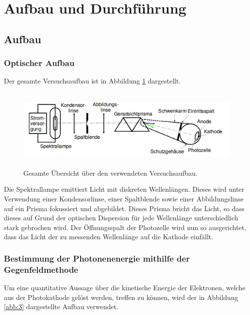 \section{Aufbau und Durchführung}
\subsection{Aufbau}
\label{sec:Aufbau}

\subsubsection{Optischer Aufbau}

Der gesamte Versuchsaufbau ist in Abbildung \ref{abb:2} dargestellt.
\begin{figure}
  \centering
  \includegraphics[height=4cm]{ressources/aufbau_2.png}
  \caption{Gesamte Übersicht über den verwendeten Versuchsaufbau. \cite{skript}}
  \label{abb:2}
\end{figure}

Die Spektrallampe emittiert Licht mit diskreten Wellenlängen. Dieses wird unter Verwendung einer Kondensorlinse, einer Spaltblende sowie einer Abbildungslinse auf ein Prisma fokussiert und abgebildet.
Dieses Prisma bricht das Licht, so dass dieses auf Grund der optischen Dispersion für jede Wellenlänge unterschiedlich stark gebrochen wird.
Der Öffnungsspalt der Photozelle wird nun so ausgerichtet, dass das Licht der zu messenden Wellenlänge auf die Kathode einfällt.

\subsubsection{Bestimmung der Photonenenergie mithilfe der Gegenfeldmethode}

Um eine quantitative Aussage über die kinetische Energie der Elektronen, welche aus der Photokathode gelöst werden, treffen zu können, wird der in Abbildung \ref{abb:3} dargestellte Aufbau verwendet.

